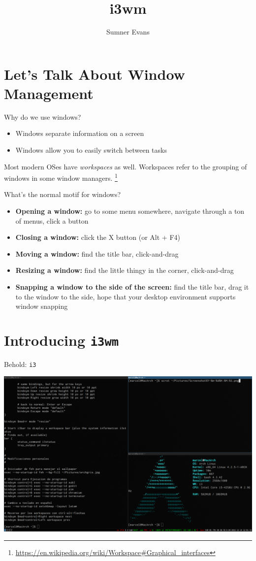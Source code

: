\documentclass{lug}
\title{i3wm}
\author{Sumner Evans}
\institute{Mines Linux Users Group}
\newcommand{\ithree}{\texttt{i3}\xspace}
\begin{document}
\section{Let's Talk About Window Management}
\begin{frame}{Why do we use windows?}
    \begin{itemize}
        \item Windows separate information on a screen
        \item Windows allow you to easily switch between tasks
    \end{itemize}

    Most modern OSes have \textit{workspaces} as well. Workspaces refer to the
    grouping of windows in some window
    managers.
    \footnote[frame]{\url{https://en.wikipedia.org/wiki/Workspace\#Graphical\_interfaces}}

\end{frame}

\begin{frame}{What's the normal motif for windows?}
    \begin{itemize}[<+->]
        \item \textbf{Opening a window:} go to some menu somewhere, navigate
            through a ton of menus, click a button
        \item \textbf{Closing a window:} click the X button (or Alt + F4)
        \item \textbf{Moving a window:} find the title bar, click-and-drag
        \item \textbf{Resizing a window:} find the little thingy in the corner,
            click-and-drag
        \item \textbf{Snapping a window to the side of the screen:} find the
            title bar, drag it to the window to the side, hope that your desktop
            environment supports window snapping
    \end{itemize}
\end{frame}

\section{Introducing \texttt{i3wm}}
\begin{frame}{Behold: \ithree}
    \hspace{1em}
    \centerline{\includegraphics[width=1.15\textwidth]{./graphics/i3-desktop}}
\end{frame}
\end{document}
